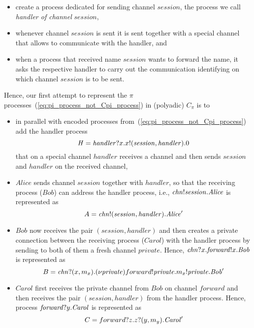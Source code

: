 \begin{itemize}
\item create a process dedicated for sending channel $\mathit{session}$, the process we call \emph{handler of channel}  $\mathit{session}$,
\item whenever channel $\mathit{session}$ is sent it is sent together with a special channel that allows to communicate with the handler, and 
\item when a process that received name $\mathit{session}$ wants to forward the name, it asks the respective handler to carry out the communication identifying on which channel $\mathit{session}$ is to be sent.
\end{itemize}  
%
Hence, our first attempt to represent the $\pi$ processes~(\ref{eq:pi_process_not_Cpi_process}) in (polyadic) $C_\pi$ is to
\begin{itemize}
\item in parallel with encoded processes from~(\ref{eq:pi_process_not_Cpi_process}) add the handler process 
\[
\mathit{H}= \mathit{handler}?x.x!(\mathit{session},\mathit{handler}).0
\]
that on a special channel $\mathit{handler}$ receives a channel and then sends $\mathit{session}$ and $\mathit{handler}$ on the received channel,
\item $\mathit{Alice}$ sends channel $\mathit{session}$ together with $\mathit{handler}$, so that the receiving process ($\mathit{Bob}$) can address the handler process, i.e., $\mathit{chn}!\mathit{session}.\mathit{Alice}$ is represented as 
\[
A=\mathit{chn}!(\mathit{session}, \mathit{handler}).\mathit{Alice}'
\]
\item $\mathit{Bob}$ now receives the pair $(\mathit{session}, \mathit{handler})$ and then creates a private connection between the receiving process ($\mathit{Carol}$) with the handler process by sending to both of them a fresh channel $\mathit{private}$. Hence, $\mathit{chn}?x.\mathit{forward}!x.\mathit{Bob}$ is represented as 
\[
B=\mathit{chn}?(x, m_x).(\nu \mathit{private})forward!\mathit{private}.m_x!\mathit{private}.\mathit{Bob}'
\]
\item $\mathit{Carol}$ first receives the private channel from $\mathit{Bob}$ on channel $\mathit{forward}$ and then receives the pair $(\mathit{session}, \mathit{handler})$ from the handler process. Hence, process $\mathit{forward}?y.\mathit{Carol}$ is represented as
\[
C=forward?z.z?(y,m_y).\mathit{Carol}'
\]
\end{itemize} 
%

